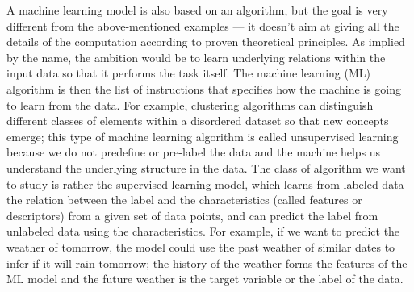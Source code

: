 \documentclass[main]{subfiles}
\begin{document}
A machine learning model is also based on an algorithm, but the goal is very different from the above-mentioned examples --- it doesn't aim at giving all the details of the computation according to proven theoretical principles. As implied by the name, the ambition would be to learn underlying relations within the input data so that it performs the task itself. The machine learning (ML) algorithm is then the list of instructions that specifies how the machine is going to learn from the data. For example, clustering algorithms can distinguish different classes of elements within a disordered dataset so that new concepts emerge; this type of machine learning algorithm is called unsupervised learning because we do not predefine or pre-label the data and the machine helps us understand the underlying structure in the data. The class of algorithm we want to study is rather the supervised learning model, which learns from labeled data the relation between the label and the characteristics (called features or descriptors) from a given set of data points, and can predict the label from unlabeled data using the characteristics. For example, if we want to predict the weather of tomorrow, the model could use the past weather of similar dates to infer if it will rain tomorrow; the history of the weather  forms the features of the ML model and the future weather is the target variable or the label of the data.
\end{document}
